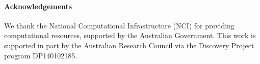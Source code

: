 {
\setlength{\parindent}{0cm}
\paragraph{\bf Acknowledgements}
We thank the National Computational Infrastructure (NCI) for providing computational resources, supported by the Australian Government. 
This work is supported in part by the Australian Research Council via the Discovery Project program DP140102185.
}

